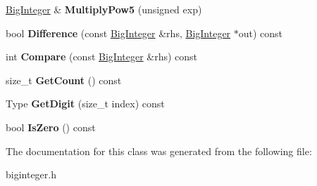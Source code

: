 \begin{DoxyCompactItemize}
\item 
\mbox{\label{a02248_a98a13f169c27d1acfa57054f37c61763}} 
\hyperlink{a02248}{Big\+Integer} \& {\bfseries Multiply\+Pow5} (unsigned exp)
\item 
\mbox{\label{a02248_ad7ad62e6b62af38283ee940eb4015b26}} 
bool {\bfseries Difference} (const \hyperlink{a02248}{Big\+Integer} \&rhs, \hyperlink{a02248}{Big\+Integer} $\ast$out) const
\item 
\mbox{\label{a02248_af8e90fff5382de6c1cda5f751017200c}} 
int {\bfseries Compare} (const \hyperlink{a02248}{Big\+Integer} \&rhs) const
\item 
\mbox{\label{a02248_aa0ad6e74839b7c7fe77c9742ec079525}} 
size\+\_\+t {\bfseries Get\+Count} () const
\item 
\mbox{\label{a02248_a7288eefd49735c3c3edec698f56738bd}} 
Type {\bfseries Get\+Digit} (size\+\_\+t index) const
\item 
\mbox{\label{a02248_ae12dd6759f1f76501db3d1bcafce39cd}} 
bool {\bfseries Is\+Zero} () const
\end{DoxyCompactItemize}


The documentation for this class was generated from the following file\+:\begin{DoxyCompactItemize}
\item 
biginteger.\+h\end{DoxyCompactItemize}
